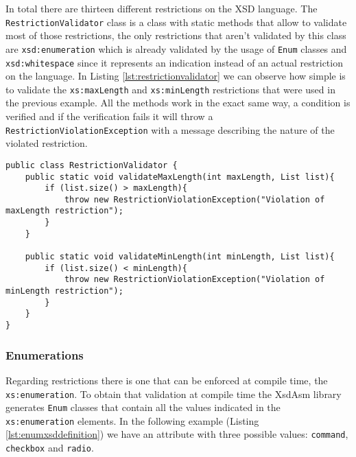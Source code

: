 \noindent
In total there are thirteen different restrictions on the \ac{XSD} language. The \texttt{RestrictionValidator} class is a class with static methods that allow to validate most of those restrictions, the only restrictions that aren't validated by this class are \texttt{xsd:enumeration} which is already validated by the usage of \texttt{Enum} classes and \texttt{xsd:whitespace} since it represents an indication instead of an actual restriction on the language. In Listing \ref{lst:restrictionvalidator} we can observe how simple is to validate the \texttt{xs:maxLength} and \texttt{xs:minLength} restrictions that were used in the previous example. All the methods work in the exact same way, a condition is verified and if the verification fails it will throw a \texttt{RestrictionViolationException} with a message describing the nature of the violated restriction.

\bigskip


\begin{minipage}{\linewidth}
\begin{lstlisting}[caption={RestrictionValidator Class (Simplified)},label={lst:restrictionvalidator}]
public class RestrictionValidator {
    public static void validateMaxLength(int maxLength, List list){
        if (list.size() > maxLength){
            throw new RestrictionViolationException("Violation of maxLength restriction");
        }
    }
    
    public static void validateMinLength(int minLength, List list){
        if (list.size() < minLength){
            throw new RestrictionViolationException("Violation of minLength restriction");
        }
    }
}
\end{lstlisting}
\end{minipage}

\subsubsection{Enumerations}
\label{sec:enumarations}

Regarding restrictions there is one that can be enforced at compile time, the \texttt{xs:enumeration}. To obtain that validation at compile time the XsdAsm library generates \texttt{Enum} classes that contain all the values indicated in the \texttt{xs:enumeration} elements. In the following example (Listing \ref{lst:enumxsddefinition}) we have an attribute with three possible values: \texttt{command}, \texttt{checkbox} and \texttt{radio}.

